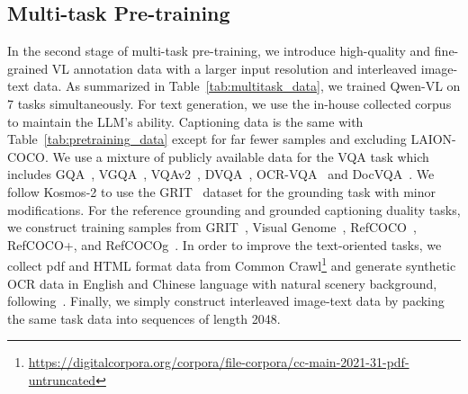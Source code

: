 \documentclass{article}
\begin{document}
\subsection{Multi-task Pre-training}



In the second stage of multi-task pre-training, we introduce high-quality and fine-grained VL annotation data with a larger input resolution and interleaved image-text data. As summarized in Table~\ref{tab:multitask_data}, we trained Qwen-VL on 7 tasks simultaneously. For text generation, we use the in-house collected corpus to maintain the LLM's ability. Captioning data is the same with Table~\ref{tab:pretraining_data} except for far fewer samples and excluding LAION-COCO. We use a mixture of publicly available data for the VQA task which includes GQA~\citep{gqa}, VGQA~\citep{vg}, VQAv2~\citep{VQAv2}, DVQA~\citep{dvqa}, OCR-VQA~\citep{ocrvqa} and DocVQA~\citep{docvqa}. We follow Kosmos-2 to use the GRIT~\citep{kosmos2} dataset for the grounding task with minor modifications. For the reference grounding and grounded captioning duality tasks, we construct training samples from GRIT~\citep{kosmos2}, Visual Genome~\citep{vg}, RefCOCO~\citep{refcoco}, RefCOCO+, and RefCOCOg~\citep{refcocog}. In order to improve the text-oriented tasks, we collect pdf and HTML format data from Common Crawl\footnote{\scriptsize\url{https://digitalcorpora.org/corpora/file-corpora/cc-main-2021-31-pdf-untruncated}} and generate synthetic OCR data in English and Chinese language with natural scenery background, following~\citep{synthdog}. Finally, we simply construct interleaved image-text data by packing the same task data into sequences of length 2048.
\end{document}

